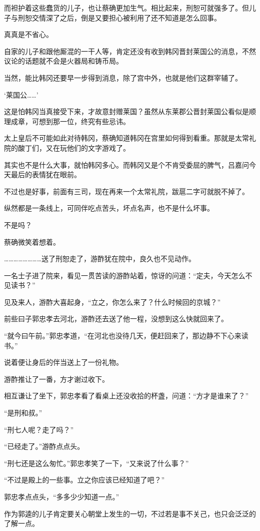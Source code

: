 而袒护着这些蠢货的儿子，也让蔡确更加生气。相比起来，刑恕可就强多了。但儿子与刑恕交情深了之后，倒是又要担心被利用了还不知道是怎么回事。

真真是不省心。

自家的儿子和跟他厮混的一干人等，肯定还没有收到韩冈晋封莱国公的消息，不然议论的话题就不会是火器局和铸币局。

当然，能比韩冈还要早一步得到消息，除了宫中外，也就是他们这群宰辅了。

‘莱国公……’

这是怕韩冈当真接受下来，才故意封赠莱国？虽然从东莱郡公晋封莱国公看似是顺理成章，可想到那一位，终究有些忌讳。

太上皇后不可能如此对待韩冈，蔡确知道韩冈在宫里如何得到看重。那就是太常礼院的酸丁们，又在玩他们的文字游戏了。

其实也不是什么大事，就怕韩冈多心。而韩冈又是个不肯受委屈的脾气，吕嘉问今天最后的表情犹在眼前。

不过也是好事，前面有三司，现在再来一个太常礼院，跋扈二字可就脱不掉了。

纵然都是一条线上，可同伴吃点苦头，坏点名声，也不是什么坏事。

不是吗？

蔡确微笑着想着。

……………………送了刑恕走了，游酢犹在院中，良久也不见动作。

一名士子进了院来，看见一贯苦读的游酢站着，惊讶的问道：“定夫，今天怎么不见读书？”

见及来人，游酢大喜起身，“立之，你怎么来了？什么时候回的京城？”

前些曰子郭忠孝去河北，游酢还去送了他一程，没想到这么快就回来了。

“就今曰午前。”郭忠孝道，“在河北也没待几天，便赶回来了，那边静不下心来读书。”

说着便让身后的伴当送上了一份礼物。

游酢推让了一番，方才谢过收下。

相互谦让了坐下，郭忠孝看了看桌上还没收拾的杯盏，问道：“方才是谁来了？”

“是刑和叔。”

“刑七人呢？走了吗？”

“已经走了。”游酢点点头。

“刑七还是这么匆忙。”郭忠孝笑了一下，“又来说了什么事？”

“不过是殿上的一些事。立之你应该已经知道了吧？”

郭忠孝点点头，“多多少少知道一点。”

作为郭逵的儿子肯定要关心朝堂上发生的一切，不过若是事不关己，也只会泛泛的了解一点。

